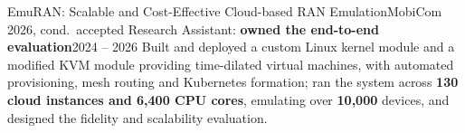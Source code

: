     \resumeSubheading
      {EmuRAN: Scalable and Cost-Effective Cloud-based RAN Emulation}{MobiCom 2026, cond.\ accepted}
      {Research Assistant: \textbf{owned the end-to-end evaluation}}{2024 -- 2026}
      \resumeItemListStart
          {Built and deployed a custom Linux kernel module and a modified KVM module providing time-dilated virtual machines, with automated provisioning, mesh routing and Kubernetes formation; ran the system across \textbf{130 cloud instances and 6,400 CPU cores}, emulating over \textbf{10,000} devices, and designed the fidelity and scalability evaluation.}
      \resumeItemListEnd

  \resumeSubHeadingListEnd
